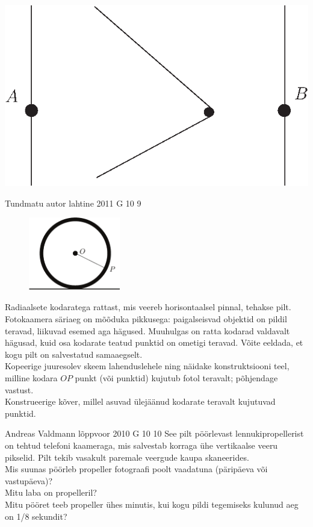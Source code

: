 \documentclass[11pt]{article}
\begin{document}
{{\begin{center}
\includegraphics[width=0.55\linewidth]{2009-v3g-08-paat.eps}
\end{center}
\fi
}

{Tundmatu autor} %
{lahtine} %
{2011} %
{G 10} %
{9} %
{
\ifStatement
\begin{figure}
	\vspace{-10pt}
	\includegraphics[width=40mm]{2011-lahg-10-kodar.pdf}
\end{figure}
Radiaalsete kodaratega rattast, mis veereb horisontaalsel pinnal, tehakse pilt.
Fotokaamera säriaeg on mõõduka pikkusega: paigalseisvad objektid on pildil teravad, 
liikuvad esemed aga hägused. Muuhulgas on ratta kodarad valdavalt hägusad, 
kuid osa kodarate teatud punktid on ometigi teravad. Võite eeldada, et kogu pilt on 
salvestatud samaaegselt. 
\\
\osa Kopeerige juuresolev skeem lahenduslehele ning näidake konstruktsiooni teel, 
milline kodara $OP$ punkt (või punktid) kujutub fotol teravalt; põhjendage vastust.\\
\osa Konstrueerige kõver, millel asuvad ülejäänud kodarate teravalt kujutuvad punktid.
\fi
}

{Andreas Valdmann} %
{lõppvoor} %
{2010} %
{G 10} %
{10} %
{
\ifStatement
See pilt pöörlevast lennukipropellerist on tehtud telefoni kaameraga, mis salvestab korraga ühe vertikaalse veeru pikselid. Pilt tekib vasakult paremale veergude kaupa skaneerides.\\
\osa Mis suunas pöörleb propeller fotograafi poolt vaadatuna (päripäeva või vastupäeva)?\\
\osa Mitu laba on propelleril?\\
\osa Mitu pööret teeb propeller ühes minutis, kui kogu pildi tegemiseks kulunud aeg on 1/8 sekundit?\\

}}
\end{document}
